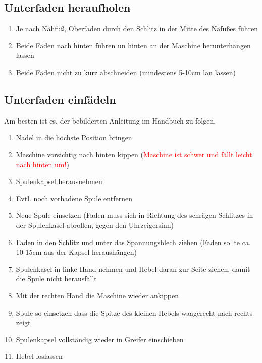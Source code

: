 \documentclass{\basedir/fablab-document}
\begin{document}
\subsection{Unterfaden heraufholen}
\begin{enumerate}
	\item Je nach Nähfuß, Oberfaden durch den Schlitz in der Mitte des Näfußes führen
	\item Beide Fäden nach hinten führen un hinten an der Maschine herunterhängen lassen
	\item Beide Fäden nicht zu kurz abschneiden (mindestens 5-10cm lan lassen)
\end{enumerate}

\subsection{Unterfaden einfädeln}

Am besten ist es, der bebilderten Anleitung im Handbuch zu folgen.

\vspace{1em}
\begin{enumerate}
 \item Nadel in die höchste Position bringen
 \item Maschine vorsichtig nach hinten kippen (\textcolor{red}{Maschine ist schwer und fällt leicht nach hinten um!})
 \item Spulenkapsel herausnehmen
 \item Evtl. noch vorhadene Spule entfernen
 \item Neue Spule einsetzen (Faden muss sich in Richtung des schrägen Schlitzes in der Spulenkasel abrollen, gegen den Uhrzeigersinn)
 \item Faden in den Schlitz und unter das Spannungsblech ziehen (Faden sollte ca. 10-15cm aus der Kapsel heraushängen)
 \item Spulenkasel in linke Hand nehmen und Hebel daran zur Seite ziehen, damit die Spule nicht herausfällt
 \item Mit der rechten Hand die Maschine wieder ankippen
 \item Spule so einsetzen dass die Spitze des kleinen Hebels waagerecht nach rechts zeigt
 \item Spulenkapsel vollständig wieder in Greifer einschieben
 \item Hebel loslassen
\end{enumerate}

\newpage
{}
\end{document}
